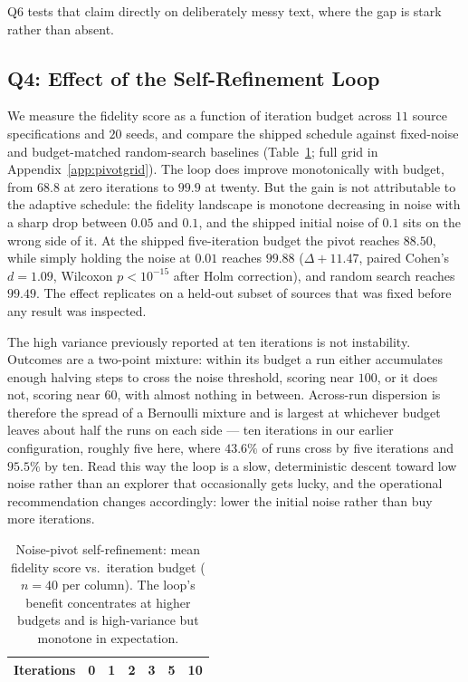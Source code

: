 \documentclass[letterpaper]{article} %
\begin{document}
Q6 tests that claim directly on deliberately messy text, where the gap is stark
rather than absent.

\subsection{Q4: Effect of the Self-Refinement Loop}
We measure the fidelity score as a function of iteration budget across $11$
source specifications and $20$ seeds, and compare the shipped schedule against
fixed-noise and budget-matched random-search baselines
(Table~\ref{tab:noise}; full grid in Appendix~\ref{app:pivotgrid}). The loop
does improve monotonically with budget, from $68.8$ at zero iterations to
$99.9$ at twenty. But the gain is not attributable to the adaptive schedule:
the fidelity landscape is monotone decreasing in noise with a sharp drop
between $0.05$ and $0.1$, and the shipped initial noise of $0.1$ sits on the
wrong side of it. At the shipped five-iteration budget the pivot reaches
$88.50$, while simply holding the noise at $0.01$ reaches $99.88$
($\Delta{+}11.47$, paired Cohen's $d{=}1.09$, Wilcoxon $p{<}10^{-15}$ after
Holm correction), and random search reaches $99.49$. The effect replicates on a
held-out subset of sources that was fixed before any result was inspected.

The high variance previously reported at ten iterations is not instability.
Outcomes are a two-point mixture: within its budget a run either accumulates
enough halving steps to cross the noise threshold, scoring near $100$, or it
does not, scoring near $60$, with almost nothing in between. Across-run
dispersion is therefore the spread of a Bernoulli mixture and is largest at
whichever budget leaves about half the runs on each side --- ten iterations in
our earlier configuration, roughly five here, where $43.6\%$ of runs cross by
five iterations and $95.5\%$ by ten. Read this way the loop is a slow,
deterministic descent toward low noise rather than an explorer that
occasionally gets lucky, and the operational recommendation changes
accordingly: lower the initial noise rather than buy more iterations.

\begin{table}[t]
\centering
\setlength{\tabcolsep}{3pt}
\begin{tabular}{lrrrrrr}
\toprule
Iterations & 0 & 1 & 2 & 3 & 5 & 10 \\
\midrule
%
\end{tabular}
\caption{Noise-pivot self-refinement: mean fidelity score vs.\ iteration budget
($n{=}40$ per column). The loop's benefit concentrates at higher budgets and is
high-variance but monotone in expectation.}
\label{tab:noise}
\end{table}
\end{document}
